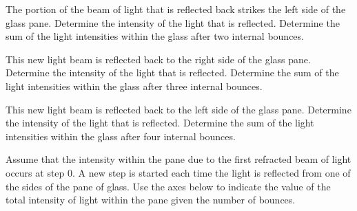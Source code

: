 \begin{problem}
\begin{subproblem}
    \item The portion of the beam of light that is reflected back strikes the left side of the glass pane.
    Determine the intensity of the light that is reflected.
    Determine the sum of the light intensities within the glass after two internal bounces.

      \vfill

    \item This new light beam is reflected back to the right side of the glass pane.
    Determine the intensity of the light that is reflected.
    Determine the sum of the light intensities within the glass after three internal bounces.

      \vfill


    \item This new light beam is reflected back to the left side of the glass pane.
    Determine the intensity of the light that is reflected.
    Determine the sum of the light intensities within the glass after four internal bounces.

        \vfill

        \clearpage

    \item Assume that the  intensity within the pane due to the first refracted beam of light occurs at step 0.
    A new step is started each time the light is reflected from one of the sides of the pane of glass.
    Use the axes below to indicate the value of the total intensity of light within the pane given the number of bounces.

\end{subproblem}
\end{problem}
